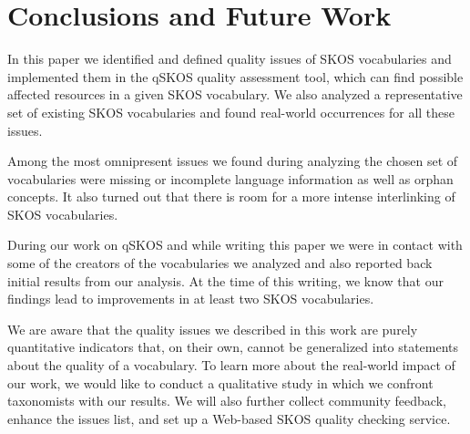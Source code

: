 \section{Conclusions and Future Work}\label{sec:conclusions}

In this paper we identified and defined quality issues of SKOS vocabularies and implemented them in the qSKOS quality assessment tool, which can find possible affected resources in a given SKOS vocabulary. We also analyzed a representative set of existing SKOS vocabularies and found real-world occurrences for all these issues. 

Among the most omnipresent issues we found during analyzing the chosen set of vocabularies were missing or incomplete language information as well as orphan concepts. It also turned out that there is room for a more intense interlinking of SKOS vocabularies.

During our work on qSKOS and while writing this paper we were in contact with some of the creators of the vocabularies we analyzed and also reported back initial results from our analysis. At the time of this writing, we know that our findings lead to improvements in at least two SKOS vocabularies.

We are aware that the quality issues we described in this work are purely quantitative indicators that, on their own, cannot be generalized into statements about the quality of a vocabulary. To learn more about the real-world impact of our work, we would like to conduct a qualitative study in which we confront taxonomists with our results. We will also further collect community feedback, enhance the issues list, and set up a Web-based SKOS quality checking service.




